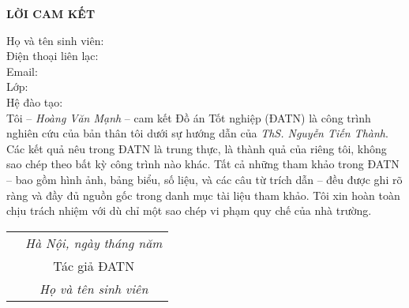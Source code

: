 \documentclass[../DoAn.tex]{subfiles}
\begin{document}
\hfill
\begin{center}
    \LARGE\textbf{LỜI CAM KẾT}\\
\end{center}
\vspace{1cm}
Họ và tên sinh viên:\dotfill\\
Điện thoại liên lạc:\dotfill\\ Email:\dotfill\\
Lớp:\dotfill\\
Hệ đào tạo:\dotfill \\

\vspace{1cm}
Tôi – \emph{Hoàng Văn Mạnh} – cam kết Đồ án Tốt nghiệp (ĐATN) là công trình nghiên cứu của bản thân tôi dưới sự hướng dẫn của \emph{ThS. Nguyễn Tiến Thành}. Các kết quả nêu trong ĐATN là trung thực, là thành quả của riêng tôi, không sao chép theo bất kỳ công trình nào khác. Tất cả những tham khảo trong ĐATN – bao gồm hình ảnh, bảng biểu, số liệu, và các câu từ trích dẫn – đều được ghi rõ ràng và đầy đủ nguồn gốc trong danh mục tài liệu tham khảo. Tôi xin hoàn toàn chịu trách nhiệm với dù chỉ một sao chép vi phạm quy chế của nhà trường.

\begin{table}[H]
\centering
\begin{tabular}{p{5cm} c}
\multicolumn{1}{c}{\textbf{}} &\emph{Hà Nội, ngày\hspace{0.5cm} tháng\hspace{0.5cm}   năm    }\vspace{0.4cm}\\
\textbf{}               & Tác giả ĐATN \vspace{3cm} \\

\textbf{}               & \emph{Họ và tên sinh viên}
\end{tabular}
\end{table}
\end{document}
